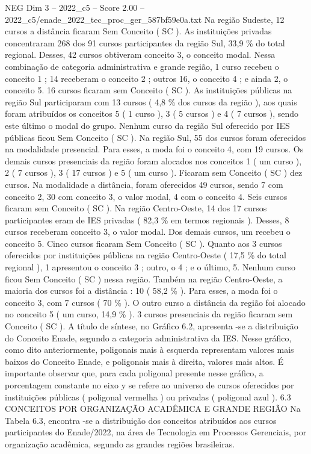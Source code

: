 \begin{textsample}{NEG Dim 3 – 2022\_c5 – Score 2.00 – 2022\_c5/enade\_2022\_tec\_proc\_ger\_587bf59e0a.txt}
Na região Sudeste, 12 cursos a distância ficaram Sem Conceito ( SC ).
As instituições privadas concentraram 268 dos 91 cursos participantes da região Sul, 33,9 \% do total regional.
Desses, 42 cursos obtiveram conceito 3, o conceito modal.
Nessa combinação de categoria administrativa e grande região, 1 curso recebeu o conceito 1 ; 14 receberam o conceito 2 ; outros 16, o conceito 4 ; e ainda 2, o conceito 5. 16 cursos ficaram sem Conceito ( SC ).
As instituições públicas na região Sul participaram com 13 cursos ( 4,8 \% dos cursos da região ), aos quais foram atribuídos os conceitos 5 ( 1 curso ), 3 ( 5 cursos ) e 4 ( 7 cursos ), sendo este último o modal do grupo.
Nenhum curso da região Sul oferecido por IES públicas ficou Sem Conceito ( SC ).
Na região Sul, 55 dos cursos foram oferecidos na modalidade presencial.
Para esses, a moda foi o conceito 4, com 19 cursos.
Os demais cursos presenciais da região foram alocados nos conceitos 1 ( um curso ), 2 ( 7 cursos ), 3 ( 17 cursos ) e 5 ( um curso ).
Ficaram sem Conceito ( SC ) dez cursos.
Na modalidade a distância, foram oferecidos 49 cursos, sendo 7 com conceito 2, 30 com conceito 3, o valor modal, 4 com o conceito 4.
Seis cursos ficaram sem Conceito ( SC ).
Na região Centro-Oeste, 14 dos 17 cursos participantes eram de IES privadas ( 82,3 \% em termos regionais ).
Desses, 8 cursos receberam conceito 3, o valor modal.
Dos demais cursos, um recebeu o conceito 5.
Cinco cursos ficaram Sem Conceito ( SC ).
Quanto aos 3 cursos oferecidos por instituições públicas na região Centro-Oeste ( 17,5 \% do total regional ), 1 apresentou o conceito 3 ; outro, o 4 ; e o último, 5.
Nenhum curso ficou Sem Conceito ( SC ) nessa região.
Também na região Centro-Oeste, a maioria dos cursos foi a distância : 10 ( 58,2 \% ).
Para esses, a moda foi o conceito 3, com 7 cursos ( 70 \% ).
O outro curso a distância da região foi alocado no conceito 5 ( um curso, 14,9 \% ). 3 cursos presenciais da região ficaram sem Conceito ( SC ).
A título de síntese, no Gráfico 6.2, apresenta -se a distribuição do Conceito Enade, segundo a categoria administrativa da IES.
Nesse gráfico, como dito anteriormente, poligonais mais à esquerda representam valores mais baixos do Conceito Enade, e poligonais mais à direita, valores mais altos.
É importante observar que, para cada poligonal presente nesse gráfico, a porcentagem constante no eixo y se refere ao universo de cursos oferecidos por instituições públicas ( poligonal vermelha ) ou privadas ( poligonal azul ). 6.3 CONCEITOS POR ORGANIZAÇÃO ACADÊMICA E GRANDE REGIÃO Na Tabela 6.3, encontra -se a distribuição dos conceitos atribuídos aos cursos participantes do Enade/2022, na área de Tecnologia em Processos Gerenciais, por organização acadêmica, segundo as grandes regiões brasileiras.

\end{textsample}
